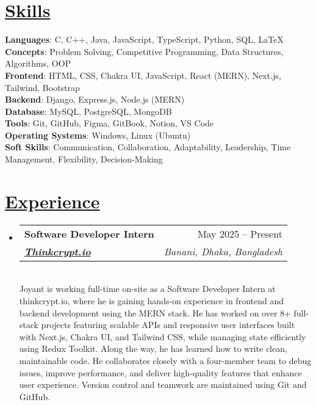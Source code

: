 \documentclass[a4paper, 11pt]{article}
\newcommand{\resumeSection}[2]{
  \section{\textbf{\href{#1}{#2}}}
}
\newcommand{\resumeSubheading}[5]{
  \vspace{-2pt}\item
    \begin{tabularx}{\textwidth}[t]{X r}
      \textbf{#1} & #2 \\
      \textbf{\textit{\href{#3}{\small #4}}} & \textit{\small #5} \\
    \end{tabularx}\vspace{-7pt}
}
\newcommand{\resumeSubHeadingListStart}{\begin{itemize}[leftmargin=0in, label={}]}
\newcommand{\resumeItemListEnd}{\end{itemize}\vspace{-5pt}}
\begin{document}
\resumeSection{https://joyant.me/skills}{Skills}
 \begin{itemize}[leftmargin=0in, label={}]
    \small{\item{
        \textbf{Languages}{: C, C++, Java, JavaScript, TypeScript, Python, SQL, LaTeX} \\
        \textbf{Concepts}{: Problem Solving, Competitive Programming, Data Structures, Algorithms, OOP} \\
        \textbf{Frontend}{: HTML, CSS, Chakra UI, JavaScript, React (MERN), Next.js, Tailwind, Bootstrap} \\
        \textbf{Backend}{: Django, Express.js, Node.js (MERN)} \\
        \textbf{Database}{: MySQL, PostgreSQL, MongoDB} \\
        \textbf{Tools}{: Git, GitHub, Figma, GitBook, Notion, VS Code} \\
        \textbf{Operating Systems}{: Windows, Linux (Ubuntu)} \\
        \textbf{Soft Skills}{: Communication, Collaboration, Adaptability, Leadership, Time Management, Flexibility, Decision-Making}
    }}
 \end{itemize}

\resumeSection{https://joyant.me/experience}{Experience}
    \resumeSubHeadingListStart
        \resumeSubheading
            {Software Developer Intern}{May 2025 -- Present}
            {https://www.thinkcrypt.dev/}{Thinkcrypt.io}{Banani, Dhaka, Bangladesh } \\ \vspace{10pt}
            Joyant is working full-time on-site as a Software Developer Intern at thinkcrypt.io, where he is gaining hands-on experience in frontend and backend development using the MERN stack. He has worked on over 8+ full-stack projects featuring scalable APIs and responsive user interfaces built with Next.js, Chakra UI, and Tailwind CSS, while managing state efficiently using Redux Toolkit. Along the way, he has learned how to write clean, maintainable code. He collaborates closely with a four-member team to debug issues, improve performance, and deliver high-quality features that enhance user experience. Version control and teamwork are maintained using Git and GitHub.
    \resumeItemListEnd
\end{document}
